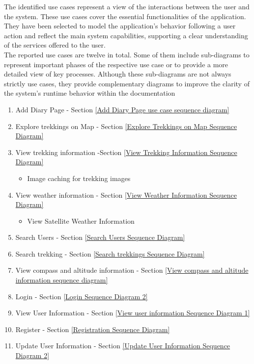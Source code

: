 The identified use cases represent a view of the interactions between the user and the system. These use cases cover the essential functionalities of the application. They have been selected to model the application's behavior following a user action and reflect the main system capabilities, supporting a clear understanding of the services offered to the user. \\
The reported use cases are twelve in total. Some of them include sub-diagrams to represent important phases of the respective use case or to provide a more detailed view of key processes. Although these sub-diagrams are not always strictly use cases, they provide complementary diagrams to improve the clarity of the system’s runtime behavior within the documentation
\begin{enumerate}
    \item Add Diary Page - Section \ref{Add Diary Page use case sequence diagram}
    \item Explore trekkings on Map - Section \ref{Explore Trekkings on Map Sequence Diagram}
    \item View trekking information -Section \ref{View Trekking Information Sequence Diagram}
        \begin{itemize}
        \item Image caching for trekking images
        \end{itemize}
    \item View weather information - Section \ref{View Weather Information Sequence Diagram}
        \begin{itemize}
        \item View Satellite Weather Information
        \end{itemize}
    \item Search Users - Section \ref{Search Users Sequence Diagram}
    \item Search trekking - Section \ref{Search trekkings Sequence Diagram}
    \item View compass and altitude information - Section \ref{View compass and altitude information sequence diagram}
    \item Login - Section \ref{Login Sequence Diagram 2}
    \item View User Information - Section \ref{View user information Sequence Diagram 1}
    \item Register - Section \ref{Registration Sequence Diagram}
    \item Update User Information - Section \ref{Update User Information Sequence Diagram 2}

\end{enumerate}
